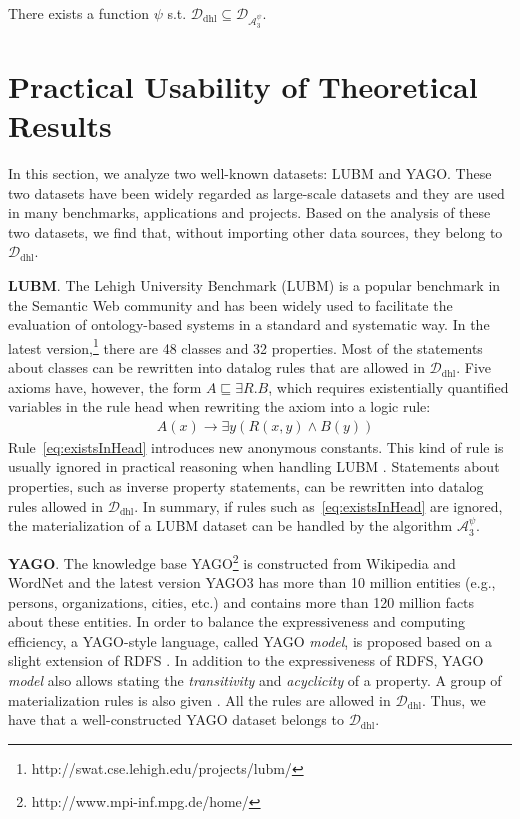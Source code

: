 \documentclass{article}
\begin{document}
\begin{theorem} There exists a function $\psi$ s.t. $\mathcal{D}_{\text{dhl}}\subseteq\mathcal{D}_{\mathcal{A}_3^{\psi}}$.
\end{theorem}

\section{Practical Usability of Theoretical Results}

In this section, we analyze two well-known datasets: LUBM and YAGO. These two datasets have been widely regarded as large-scale datasets and they are used in many benchmarks, applications and projects. %
Based on the analysis of these two datasets, we find that, without importing other data sources, they belong to
$\mathcal{D}_{\text{dhl}}$.

\textbf{LUBM}. The Lehigh University Benchmark (LUBM) is a popular benchmark in the Semantic Web community \cite{DBLP:journals/ws/GuoPH05} and has been widely used to facilitate the evaluation of ontology-based systems in a standard and systematic way. In the latest version,\footnote{http://swat.cse.lehigh.edu/projects/lubm/} there are 48 classes and 32 properties. Most of the statements about classes can be rewritten into datalog rules that are allowed in $\mathcal{D}_{\text{dhl}}$. Five axioms have, however, the form $A\sqsubseteq\exists R.B$, which requires existentially quantified variables in the rule head when rewriting the axiom into a logic rule:
\begin{align}
& A(x)\rightarrow\exists y(R(x,y)\wedge B(y))\label{eq:existsInHead}
\end{align}
Rule~\eqref{eq:existsInHead} introduces new anonymous constants. This kind of rule is usually ignored in
practical reasoning when handling LUBM \cite{DBLP:journals/ws/UrbaniKMHB12,DBLP:conf/semweb/WeaverH09}.
Statements about properties, such as inverse property statements, can be rewritten into datalog rules allowed in $\mathcal{D}_{\text{dhl}}$. In summary, if rules such as~\eqref{eq:existsInHead} are ignored, the materialization of a LUBM dataset can be handled by the algorithm $\mathcal{A}_3^{\psi}$.

\textbf{YAGO}. The knowledge base YAGO\footnote{http://www.mpi-inf.mpg.de/home/} is constructed from Wikipedia and WordNet and the  latest version YAGO3 \cite{DBLP:conf/cidr/MahdisoltaniBS15} has more than 10 million entities (e.g., persons, organizations, cities, etc.) and contains more than 120 million facts about these entities. In order to balance the expressiveness and computing efficiency, a YAGO-style language, called YAGO \emph{model}, is proposed based on a slight extension of RDFS \cite{DBLP:journals/ws/SuchanekKW08}. In addition to the expressiveness of RDFS, YAGO \emph{model} also allows stating the \emph{transitivity} and \emph{acyclicity} of a property. A group of materialization rules is also given \cite{DBLP:journals/ws/SuchanekKW08}. All the rules are allowed in $\mathcal{D}_{\text{dhl}}$. Thus, we have that a well-constructed YAGO dataset belongs to $\mathcal{D}_{\text{dhl}}$.
\end{document}
